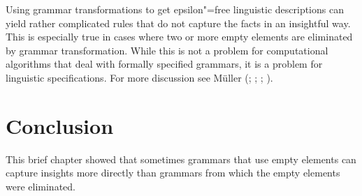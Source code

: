Using grammar transformations to get epsilon"=free linguistic descriptions can yield rather
complicated rules that do not capture the facts in an insightful way. This is
especially true in cases where two or more empty elements are eliminated by
grammar transformation. While this is not a problem for computational algorithms
that deal with formally specified grammars, it is a problem for linguistic specifications.
For more discussion see Müller (\citeyear[Chapter~6.2.5.1]{Mueller2002b};
\citeyear{Mueller2005c}; \citeyear{Mueller2004e}; \citeyear[Chapter~19]{MuellerGT-Eng1}).





\section{Conclusion}

This brief chapter showed that sometimes grammars that use empty elements can capture insights more
directly than grammars from which the empty elements were eliminated.


